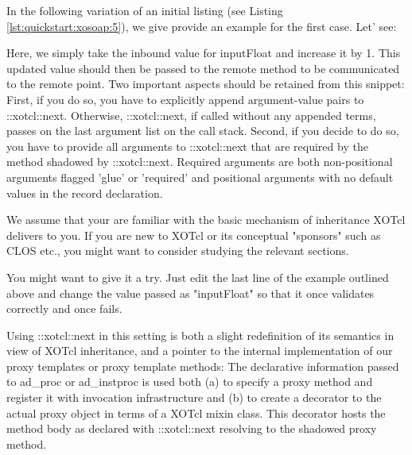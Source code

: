 In the following variation of an initial listing (see Listing \ref{lst:quickstart:xosoap:5}), we give provide an example for the first case. Let' see:



Here, we simply take the inbound value for inputFloat and increase it by 1. This updated value should then be passed to the remote method to be communicated to the remote point. Two important aspects should be retained from this snippet: First, if you do so, you have to explicitly append argument-value pairs to ::xotcl::next. Otherwise, ::xotcl::next, if called without any appended terms, passes on the last argument list on the call stack. Second, if you decide to do so, you have to provide all arguments to ::xotcl::next that are required by the method shadowed by ::xotcl::next. Required arguments are both non-positional arguments flagged 'glue' or 'required' and positional arguments with no default values in the record declaration.


\begin{hints}
\item We assume that your are familiar with the basic mechanism of inheritance XOTcl delivers to you. If you are new to XOTcl or its conceptual "sponsors" such as CLOS etc., you might want to consider studying the relevant sections.
\item You might want to give it a try. Just edit the last line of the example outlined above and change the value passed as "inputFloat" so that it once validates correctly and once fails.
\end{hints}

Using ::xotcl::next in this setting is both a slight redefinition of its semantics in view of XOTcl inheritance, and a pointer to the internal implementation of our proxy templates or proxy template methods: The declarative information passed to ad\_proc or ad\_instproc is used both (a) to specify a proxy method and register it with invocation infrastructure and (b) to create a decorator to the actual proxy object in terms of a XOTcl mixin class. This decorator hosts the method body as declared with ::xotcl::next resolving to the shadowed proxy method.


